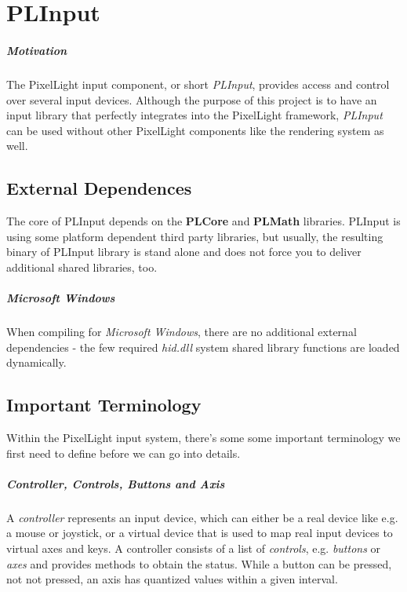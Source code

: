 \chapter{PLInput}


\paragraph{Motivation}
The PixelLight input component, or short \emph{PLInput}, provides access and control over several input devices. Although the purpose of this project is to have an input library that perfectly integrates into the PixelLight framework, \emph{PLInput} can be used without other PixelLight components like the rendering system as well.




\section{External Dependences}
The core of PLInput depends on the \textbf{PLCore} and \textbf{PLMath} libraries. PLInput is using some platform dependent third party libraries, but usually, the resulting binary of PLInput library is stand alone and does not force you to deliver additional shared libraries, too.


\paragraph{Microsoft Windows}
When compiling for \emph{Microsoft Windows}, there are no additional external dependencies - the few required \emph{hid.dll} system shared library functions are loaded dynamically.




\section{Important Terminology}
Within the PixelLight input system, there's some some important terminology we first need to define before we can go into details.


\paragraph{Controller, Controls, Buttons and Axis}
A \emph{controller} represents an input device, which can either be a real device like e.g. a mouse or joystick, or a virtual device that is used to map real input devices to virtual axes and keys. A controller consists of a list of \emph{controls}, e.g. \emph{buttons} or \emph{axes} and provides methods to obtain the status. While a button can be pressed, not not pressed, an axis has quantized values within a given interval.


